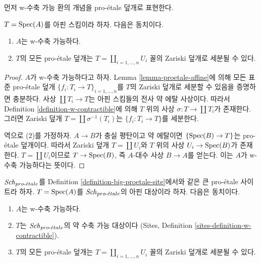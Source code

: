 \noindent
먼저 w-수축 가능 환의 개념을 pro-\'etale 덮개로 표현한다.

\begin{lemma}
\label{lemma-w-contractible-proetale-cover}
$T = \mathop{\mathrm{Spec}}(A)$를 아핀 스킴이라 하자. 다음은 동치이다.
\begin{enumerate}
\item $A$는 w-수축 가능하다.
\item $T$의 모든 pro-\'etale 덮개는
$T = \coprod_{i = 1, \ldots, n} U_i$ 꼴의 Zariski 덮개로 세분될 수 있다.
\end{enumerate}
\end{lemma}

\begin{proof}
$A$가 w-수축 가능하다고 하자. Lemma \ref{lemma-proetale-affine}에 의해
모든 표준 pro-\'etale 덮개
$\{f_i : T_i \to T\}_{i = 1, \ldots, n}$를 $T$의 Zariski 덮개로
세분할 수 있음을 증명하면 충분하다. 사상 $\coprod T_i \to T$는 아핀
스킴들의 전사 약 에탈 사상이다. 따라서 Definition
\ref{definition-w-contractible}에 의해 $T$ 위의 사상
$\sigma : T \to \coprod T_i$가 존재한다. 그러면 Zariski 덮개
$T = \coprod \sigma^{-1}(T_i)$는 $\{f_i : T_i \to T\}$를 세분한다.

\medskip\noindent
역으로 (2)를 가정하자. $A \to B$가 충실 평탄이고 약 에탈이면
$\{\mathop{\mathrm{Spec}}(B) \to T\}$는 pro-\'etale 덮개이다. 따라서 Zariski 덮개
$T = \coprod U_i$와 $T$ 위의 사상 $U_i \to \mathop{\mathrm{Spec}}(B)$가 존재한다.
$T = \coprod U_i$이므로 $T \to \mathop{\mathrm{Spec}}(B)$, 즉 $A$-대수 사상
$B \to A$를 얻는다. 이는 $A$가 w-수축 가능하다는 뜻이다.
\end{proof}

\begin{lemma}
\label{lemma-w-contractible-is-weakly-contractible}
$\mathit{Sch}_{pro\text{-}\acute{e}tale}$를 Definition \ref{definition-big-proetale-site}에서와
같은 큰 pro-\'etale 사이트라 하자. $T = \mathop{\mathrm{Spec}}(A)$를
$\mathit{Sch}_{pro\text{-}\acute{e}tale}$의 아핀 대상이라 하자. 다음은 동치이다.
\begin{enumerate}
\item $A$는 w-수축 가능하다.
\item $T$는 $\mathit{Sch}_{pro\text{-}\acute{e}tale}$의 약 수축 가능 대상이다
(Sites, Definition \ref{sites-definition-w-contractible}).
\item $T$의 모든 pro-\'etale 덮개는
$T = \coprod_{i = 1, \ldots, n} U_i$ 꼴의 Zariski 덮개로 세분될 수 있다.
\end{enumerate}
\end{lemma}

